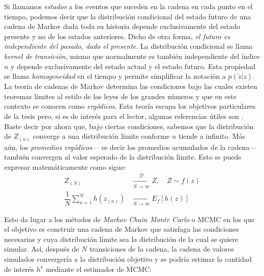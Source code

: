 Si llamamos \textit{estados} a los eventos que suceden en la cadena en cada punto en el tiempo, podemos decir que la distribución condicional del estado futuro de una cadena de Markov dada toda su historia depende exclusivamente del estado presente y no de los estados anteriores. Dicho de otra forma, \textit{el futuro es independiente del pasado, dado el presente}. La distribución condicional se llama \textit{kernel de transición}, mismo que normalmente es también independiente del índice $n$ y depende exclusivamente del estado actual y el estado futuro. Esta propiedad se llama \textit{homogeneidad} en el tiempo y permite simplificar la notación a $p(\tilde{z}|z)$.\\ 

La teoría de cadenas de Markov determina las condiciones bajo las cuales existen teoremas límites al estilo de las leyes de los grandes números y que en este contexto se conocen como \textit{ergódicos}. Esta teoría escapa los objetivos particulares de la tesis pero, si es de interés para el lector, algunas referencias útiles son \textcites{Rincon12,Neal93,Ross96,TaylorKarlin84}. Baste decir por ahora que, bajo ciertas condiciones, sabemos que la distribución de $Z_{(n)}$ converge a una distribución límite conforme $n$ tiende a infinito. Más aún, los \textit{promedios ergódicos}--- es decir los promedios acumulados de la cadena--- también convergen al valor esperado de la distribución límite. Esto se puede expresar matemáticamente como sigue:
\begin{subequations}\label{eq:Teo_Erg}
\begin{align}
Z_{(N)} &\xrightarrow[N\rightarrow\infty]{\mathcal{D}} Z, \quad Z \sim f(z) \label{eq:Teo_Erg_Conv_D} \\
\dfrac{1}{N}\sum\limits_{n=1}^N h(z_{(n)}) &\xrightarrow[N\rightarrow\infty]{} E_{f}[h(z)]
\label{eq:Teo_Erg_Conv_Prom}
\end{align}
\end{subequations}

Esto da lugar a los métodos de \textit{Markov Chain Monte Carlo} o MCMC en los que el objetivo es construir una cadena de Markov que satisfaga las condiciones necesarias y cuya distribución límite sea la distribución de la cual se quiere simular. Así, después de $N$ transiciones de la cadena, la cadena de valores simulados convergería a la distribución objetivo y se podría estimar la cantidad de interés $h^\star$ mediante el estimador de MCMC: 

